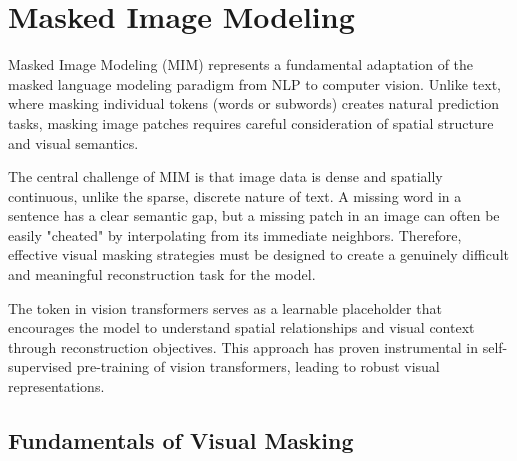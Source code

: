 
\section{Masked Image Modeling}

Masked Image Modeling (MIM) represents a fundamental adaptation of the masked language modeling paradigm from NLP to computer vision. Unlike text, where masking individual tokens (words or subwords) creates natural prediction tasks, masking image patches requires careful consideration of spatial structure and visual semantics.

The central challenge of MIM is that image data is dense and spatially continuous, unlike the sparse, discrete nature of text. A missing word in a sentence has a clear semantic gap, but a missing patch in an image can often be easily "cheated" by interpolating from its immediate neighbors. Therefore, effective visual masking strategies must be designed to create a genuinely difficult and meaningful reconstruction task for the model.

\begin{comment}
Feedback: This is a good introduction. To make the core challenge clearer, you could add: "The central challenge of MIM is that image data is dense and spatially continuous, unlike the sparse, discrete nature of text. A missing word in a sentence has a clear semantic gap, but a missing patch in an image can often be easily 'cheated' by interpolating from its immediate neighbors. Therefore, effective visual masking strategies must be designed to create a genuinely difficult and meaningful reconstruction task for the model."

STATUS: addressed - added explanation of the fundamental challenge of dense, spatially continuous image data vs sparse discrete text
\end{comment}

The \mask{} token in vision transformers serves as a learnable placeholder that encourages the model to understand spatial relationships and visual context through reconstruction objectives. This approach has proven instrumental in self-supervised pre-training of vision transformers, leading to robust visual representations.

\subsection{Fundamentals of Visual Masking}

